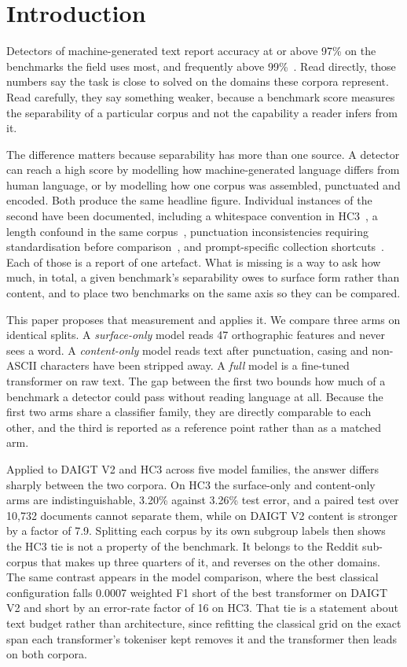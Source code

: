 \section{Introduction}

Detectors of machine-generated text report accuracy at or above 97\% on the benchmarks the field uses most, and frequently above 99\%~\cite{Guo2023close,Su2023plus,Zhou2024exploiting,Ansary2026multirepresentation}. Read directly, those numbers say the task is close to solved on the domains these corpora represent. Read carefully, they say something weaker, because a benchmark score measures the separability of a particular corpus and not the capability a reader infers from it.

The difference matters because separability has more than one source. A detector can reach a high score by modelling how machine-generated language differs from human language, or by modelling how one corpus was assembled, punctuated and encoded. Both produce the same headline figure. Individual instances of the second have been documented, including a whitespace convention in HC3~\cite{Tian2023multiscale}, a length confound in the same corpus~\cite{Baidya2026detecting}, punctuation inconsistencies requiring standardisation before comparison~\cite{Ardeshirifar2025comparing}, and prompt-specific collection shortcuts~\cite{Park2024investigating}. Each of those is a report of one artefact. What is missing is a way to ask how much, in total, a given benchmark's separability owes to surface form rather than content, and to place two benchmarks on the same axis so they can be compared.

This paper proposes that measurement and applies it. We compare three arms on identical splits. A \emph{surface-only} model reads 47 orthographic features and never sees a word. A \emph{content-only} model reads text after punctuation, casing and non-ASCII characters have been stripped away. A \emph{full} model is a fine-tuned transformer on raw text. The gap between the first two bounds how much of a benchmark a detector could pass without reading language at all. Because the first two arms share a classifier family, they are directly comparable to each other, and the third is reported as a reference point rather than as a matched arm.

Applied to DAIGT V2 and HC3 across five model families, the answer differs sharply between the two corpora. On HC3 the surface-only and content-only arms are indistinguishable, 3.20\% against 3.26\% test error, and a paired test over 10,732 documents cannot separate them, while on DAIGT V2 content is stronger by a factor of 7.9. Splitting each corpus by its own subgroup labels then shows the HC3 tie is not a property of the benchmark. It belongs to the Reddit sub-corpus that makes up three quarters of it, and reverses on the other domains. The same contrast appears in the model comparison, where the best classical configuration falls 0.0007 weighted F1 short of the best transformer on DAIGT V2 and short by an error-rate factor of 16 on HC3. That tie is a statement about text budget rather than architecture, since refitting the classical grid on the exact span each transformer's tokeniser kept removes it and the transformer then leads on both corpora.

